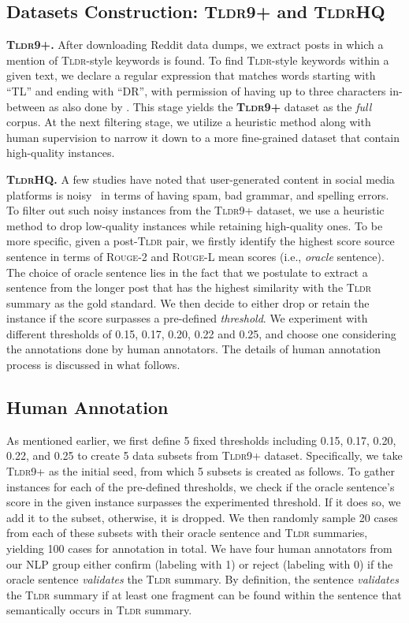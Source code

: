 \documentclass[11pt]{article}
\newcommand{\tldrl}{\textsc{Tldr9+}}
\newcommand{\tldrs}{\textsc{TldrHQ}}
\newcommand{\tldr}{\textsc{Tldr}}
\begin{document}
\subsection{Datasets Construction: \tldrl{} and \tldrs{}}
\noindent \textbf{\tldrl.}  After downloading Reddit data dumps, we extract posts in which a mention of \textsc{Tldr}-style keywords is found. To find \textsc{Tldr}-style keywords within a given text, we declare a regular expression that matches words starting with ``TL'' and ending with ``DR'', with permission of having up to three characters in-between as also done by \citet{Vlske2017TLDRMR}. This stage yields the \textbf{\tldrl} dataset as the \textit{full} corpus. At the next filtering stage, we utilize a heuristic method along with human supervision to narrow it down to a more fine-grained dataset that contain high-quality instances. 


\noindent \textbf{\tldrs.} A few studies have noted that user-generated content in social media platforms is noisy~\cite{Liu2015EstimatingUL} in terms of having spam, bad grammar, and spelling errors. To filter out such noisy instances from the \tldrl{} dataset, we use a heuristic method to drop low-quality instances while retaining high-quality ones. To be more specific, given a post-\tldr{} pair, we firstly identify the highest score source sentence in terms of \textsc{Rouge-2} and \textsc{Rouge-L} mean scores (i.e., \textit{oracle} sentence). The choice of oracle sentence lies in the fact that we postulate to extract a sentence from the longer post that has the highest similarity with the \tldr{} summary as the gold standard. We then decide to either drop or retain the instance if the score surpasses a pre-defined \textit{threshold}. We experiment with different thresholds of 0.15, 0.17, 0.20, 0.22 and 0.25, and choose one considering the annotations done by human annotators. The details of human annotation process is discussed in what follows. 

\subsection{Human Annotation}
As mentioned earlier, we first define 5 fixed thresholds including 0.15, 0.17, 0.20, 0.22, and 0.25 to create 5 data subsets from \tldrl{} dataset. Specifically, we take \tldrl{} as the initial seed, from which 5 subsets is created as follows. To gather instances for each of the pre-defined thresholds, we check if the oracle sentence's score in the given instance surpasses the experimented threshold. If it does so, we add it to the subset, otherwise, it is dropped. We then randomly sample 20 cases from each of these subsets with their oracle sentence and \textsc{Tldr} summaries, yielding 100 cases for annotation in total. We have four human annotators from our NLP group either confirm (labeling with 1) or reject (labeling with 0) if the oracle sentence \textit{validates} the \textsc{Tldr} summary. By definition, the sentence \textit{validates} the \tldr{} summary if at least one fragment can be found within the sentence that semantically occurs in \tldr{} summary. 
\end{document}
